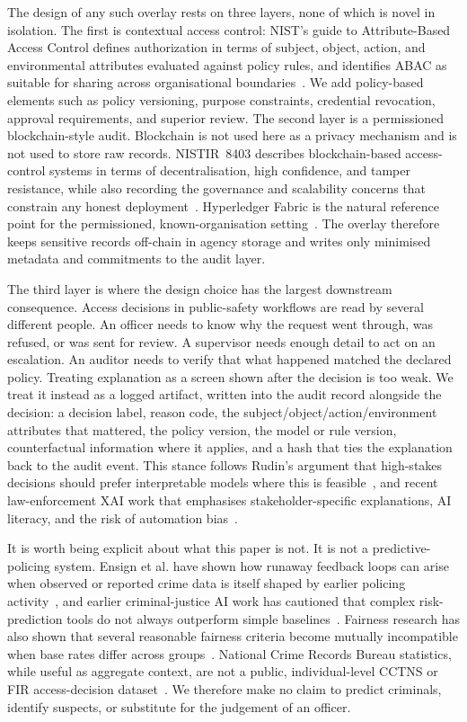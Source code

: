 The design of any such overlay rests on three layers, none of which is
novel in isolation. The first is contextual access control: NIST's guide
to Attribute-Based Access Control defines authorization in terms of
subject, object, action, and environmental attributes evaluated against
policy rules, and identifies ABAC as suitable for sharing across
organisational boundaries~\cite{nist_abac_2014}. We add policy-based
elements such as policy versioning, purpose constraints, credential
revocation, approval requirements, and superior review. The second layer
is a permissioned blockchain-style audit. Blockchain is not used here as a
privacy mechanism and is not used to store raw records. NISTIR~8403
describes blockchain-based access-control systems in terms of
decentralisation, high confidence, and tamper resistance, while also
recording the governance and scalability concerns that constrain any
honest deployment~\cite{nist_blockchain_access_2022}. Hyperledger Fabric is
the natural reference point for the permissioned, known-organisation
setting~\cite{androulaki_fabric_2018}. The overlay therefore keeps
sensitive records off-chain in agency storage and writes only minimised
metadata and commitments to the audit layer.

The third layer is where the design choice has the largest downstream
consequence. Access decisions in public-safety workflows are read by
several different people. An officer needs to know why the request went
through, was refused, or was sent for review. A supervisor needs enough
detail to act on an escalation. An auditor needs to verify that what
happened matched the declared policy. Treating explanation as a screen
shown after the decision is too weak. We treat it instead as a logged
artifact, written into the audit record alongside the decision: a decision
label, reason code, the subject/object/action/environment attributes that
mattered, the policy version, the model or rule version, counterfactual
information where it applies, and a hash that ties the explanation back to
the audit event. This stance follows Rudin's argument that high-stakes
decisions should prefer interpretable models where this is
feasible~\cite{rudin_2019}, and recent law-enforcement XAI work that
emphasises stakeholder-specific explanations, AI literacy, and the risk of
automation bias~\cite{zocholl_xai_law_enforcement_2025}.

It is worth being explicit about what this paper is not. It is not a
predictive-policing system. Ensign et al. have shown how runaway feedback
loops can arise when observed or reported crime data is itself shaped by
earlier policing activity~\cite{ensign_feedback_2018}, and earlier
criminal-justice AI work has cautioned that complex risk-prediction tools
do not always outperform simple
baselines~\cite{dressel_fairness_limits_2018}. Fairness research has also
shown that several reasonable fairness criteria become mutually
incompatible when base rates differ across
groups~\cite{chouldechova_2017,kleinberg_tradeoffs_2016}. National Crime
Records Bureau statistics, while useful as aggregate context, are not a
public, individual-level CCTNS or FIR access-decision
dataset~\cite{ncrb_2023}. We therefore make no claim to predict criminals,
identify suspects, or substitute for the judgement of an officer.

